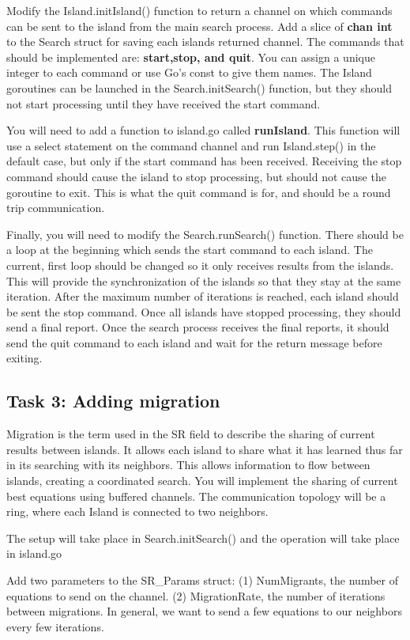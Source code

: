 \documentclass[a4paper,10pt]{article}
\begin{document}
Modify the Island.initIsland() function to
return a channel on which commands can be
sent to the island from the main search process.
Add a slice of \textbf{chan int} to the Search struct
for saving each islands returned channel.
The commands that should be implemented are:
\textbf{start,stop, and quit}.
You can assign a unique integer to each command
or use Go's const to give them names.
The Island goroutines can be launched in the Search.initSearch()
function, but they should not start processing until
they have received the start command.

You will need to add a function to island.go called
\textbf{runIsland}. This function will use a 
select statement on the command channel
and run Island.step() in the default case,
but only if the start command has been received.
Receiving the stop command should cause
the island to stop processing, but should
not cause the goroutine to exit. This is
what the quit command is for, and should
be a round trip communication.

Finally, you will need to modify the Search.runSearch()
function. There should be a loop at the beginning
which sends the start command to each island.
The current, first loop should be changed so
it only receives results from the islands.
This will provide the synchronization
of the islands so that they stay at the same iteration.
After the maximum number of iterations
is reached, each island should be sent
the stop command. Once all islands
have stopped processing, they should
send a final report. Once the search
process receives the final reports,
it should send the quit command
to each island and wait for the
return message before exiting.


\subsection*{Task 3: Adding migration}
Migration is the term used in the SR field
to describe the sharing of current results
between islands. It allows each island
to share what it has learned thus far 
in its searching with its neighbors.
This allows information to flow 
between islands, creating a coordinated search.
You will implement the sharing of 
current best equations using buffered channels.
The communication topology will be a ring, where
each Island is connected to two neighbors.

The setup will take place in Search.initSearch()
and the operation will take place in island.go

Add two parameters to the SR\_Params struct:
(1) NumMigrants, the number of equations to send on the channel.
(2) MigrationRate, the number of iterations between migrations.
In general, we want to send a few equations to our neighbors
every few iterations.
\end{document}
